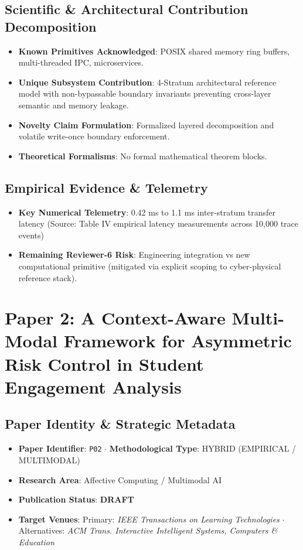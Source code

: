 \documentclass[11pt,a4paper]{article}
\begin{document}
\subsection*{Scientific & Architectural Contribution Decomposition}
\begin{itemize}[leftmargin=1.5em, itemsep=0.2em]
    \item \textbf{Known Primitives Acknowledged}: POSIX shared memory ring buffers, multi-threaded IPC, microservices.
    \item \textbf{Unique Subsystem Contribution}: 4-Stratum architectural reference model with non-bypassable boundary invariants preventing cross-layer semantic and memory leakage.
    \item \textbf{Novelty Claim Formulation}: Formalized layered decomposition and volatile write-once boundary enforcement.
    \item \textbf{Theoretical Formalisms}: No formal mathematical theorem blocks.
\end{itemize}

\subsection*{Empirical Evidence & Telemetry}
\begin{itemize}[leftmargin=1.5em, itemsep=0.2em]
    \item \textbf{Key Numerical Telemetry}: 0.42 ms to 1.1 ms inter-stratum transfer latency (Source: Table IV empirical latency measurements across 10,000 trace events)
    \item \textbf{Remaining Reviewer-6 Risk}: Engineering integration vs new computational primitive (mitigated via explicit scoping to cyber-physical reference stack).
\end{itemize}

\section{Paper 2: A Context-Aware Multi-Modal Framework for Asymmetric Risk Control in Student Engagement Analysis}

\subsection*{Paper Identity \& Strategic Metadata}
\begin{itemize}[leftmargin=1.5em, itemsep=0.2em]
    \item \textbf{Paper Identifier}: \texttt{P02} $\cdot$ \textbf{Methodological Type}: HYBRID (EMPIRICAL / MULTIMODAL)
    \item \textbf{Research Area}: Affective Computing / Multimodal AI
    \item \textbf{Publication Status}: \textbf{DRAFT}
    \item \textbf{Target Venues}: Primary: \textit{IEEE Transactions on Learning Technologies} $\cdot$ Alternatives: \textit{ACM Trans. Interactive Intelligent Systems, Computers \& Education}
\end{itemize}
\end{document}
